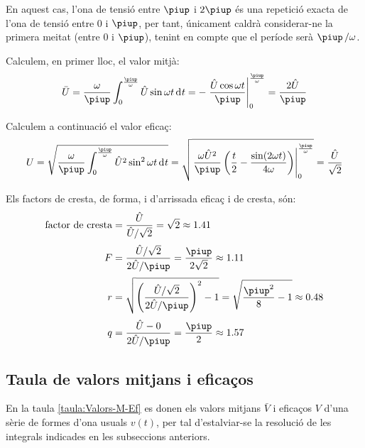 \begin{exemple}[\FactorsCrestaFormaArr{}]
    En aquest cas, l'ona de tensió entre $\piup$ i $2\piup$ és una repetició
    exacta de l'ona de tensió entre 0 i $\piup$, per tant, únicament
    caldrà considerar-ne la primera meitat (entre 0 i $\piup$), tenint en
    compte que el període serà $\piup\,/\omega$.

     Calculem, en primer lloc, el valor mitjà:
    \[
    \bar{U} = \frac{\omega}{\piup} \int_0^\frac{\piup}{\omega} \hat{U}
    \sin\omega t \diff t  = - \left. \frac{\hat{U} \cos\omega t}{\piup}
    \right|_0^\frac{\piup}{\omega} = \frac{2 \hat{U}}{\piup}
    \]

    Calculem a continuació el valor eficaç:
    \[
    U = \sqrt{\frac{\omega}{\piup} \int_0^\frac{\piup}{\omega} \hat{U}^2
    \sin^2\omega t \diff t } =   \sqrt{\left.\frac{\omega
    \hat{U}^2}{\piup}\left( \frac{t}{2} - \frac{\sin (2\omega t)}{4\omega}
    \right)\right|_0^\frac{\piup}{\omega}}  = \frac{\hat{U}}{\sqrt{2}}
    \]

    Els factors de cresta, de forma, i d'arrissada eficaç i de cresta, són:
    \begin{align*}
        \text{factor de cresta} &= \frac{\hat{U}}{\hat{U}/\sqrt{2}} = \sqrt{2} \approx\num{1,41} \\[0.5ex]
        F &= \frac{\hat{U}/\sqrt{2}}{2 \hat{U}/\piup} =\frac{\piup}{2\sqrt{2}} \approx
        \num{1,11} \\[0.5ex]
    r &= \sqrt{\left(\frac{\hat{U}/\sqrt{2}}{2 \hat{U}/\piup}\right)^2-1}
    = \sqrt{\frac{\piup^2}{8}-1} \approx \num{0,48}\\[0.5ex]
    q &=  \frac{\hat{U} - 0}{2 \hat{U}/\piup} = \frac{\piup}{2} \approx \num{1,57}
    \end{align*}
\end{exemple}


\subsection{Taula de valors mitjans i eficaços}

En la taula \vref{taula:Valors-M-Ef}  es donen els valors mitjans $\bar{V}$ i eficaços $V$ d'una sèrie de formes d'ona usuals $v(t)$, per tal d'estalviar-se la resolució de les integrals indicades en les subseccions anteriors.

